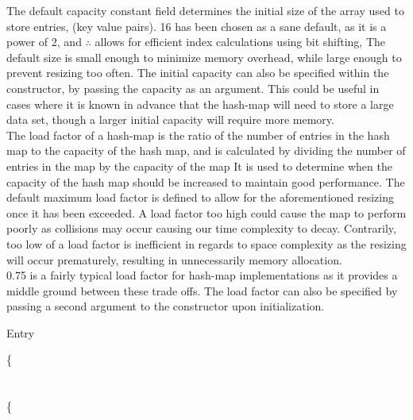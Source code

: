 \documentclass[a4paper]{article}
\begin{document}
The default capacity constant field determines the initial size of the array
used to store entries, (key value pairs). 16 has been chosen as a sane default,
as it is a power of 2, and $\therefore$ allows for efficient index calculations using bit shifting,
The default size is small enough to minimize memory overhead,
while large enough to prevent resizing too often.
The initial capacity can also be specified within the constructor, 
by passing the capacity as an argument. 
This could be useful in cases where it is known in advance that the hash-map will need 
to store a large data set, though a larger initial capacity will require more memory. \\


The load factor of a hash-map is the ratio of the number of entries in the hash map to the capacity of the hash map,
and is calculated by dividing the number of entries in the map by the capacity of the map
It is used to determine when the capacity of the hash map should be increased to maintain good performance.
The default maximum load factor is defined to allow for the aforementioned resizing once it has been exceeded.
A load factor too high could cause the map to perform poorly as collisions may occur causing our time complexity to decay. 
Contrarily, too low of a load factor is inefficient in regards to space complexity as the resizing will occur prematurely,
resulting in unnecessarily memory allocation. \\

0.75 is a fairly typical load factor for hash-map implementations as it provides a middle ground between
these trade offs. The load factor can also be specified by passing a second argument to the constructor upon initialization. \pagebreak




\makeatletter
\renewcommand{\ALG@name}{Nested Class}
\makeatother
\setcounter{algorithm}{0}

\begin{algorithm}
\caption{Entry}\label{euclid}
\begin{algorithmic}[1]



\algrenewcommand{}
 {\{} \\
 \\

\State{}
\State{}
\State{}
\State{\{} \\
\{
\EndProcedure
\end{algorithmic}
\end{algorithm}
\end{document}
